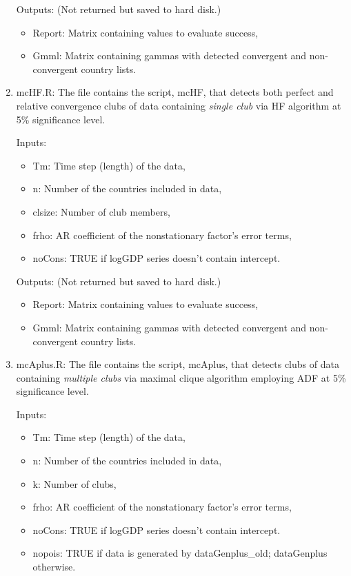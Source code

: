 \documentclass{article}
\begin{document}
\begin{enumerate}
		Outputs: (Not returned but saved to hard disk.)
		
		\begin{itemize}
		\item Report: Matrix containing values to evaluate success,
		\item Gmml: Matrix containing gammas with detected convergent and non-convergent country lists.
		\end{itemize}		 	
		
	\item mcHF.R: The file contains the script, mcHF, that detects both perfect and relative convergence clubs of data containing \textit{single club} via HF algorithm at 5\% significance level.
	
	Inputs:
	\begin{itemize}
		
		\item Tm: Time step (length) of the data,
		\item n: Number of the countries included in data,
		\item clsize: Number of club members, 
		\item frho: AR coefficient of the nonstationary factor's error terms,
		\item noCons: TRUE if logGDP series doesn't contain intercept.
	\end{itemize}
	
	Outputs: (Not returned but saved to hard disk.)
	
	\begin{itemize}
		\item Report: Matrix containing values to evaluate success,
		\item Gmml: Matrix containing gammas with detected convergent and non-convergent country lists.
	\end{itemize}		 	
	
		\item mcAplus.R: The file contains the script, mcAplus, that detects clubs of data containing \textit{multiple clubs} via maximal clique algorithm employing ADF at 5\% significance level.
		
		Inputs:
		\begin{itemize}
			
			\item Tm: Time step (length) of the data,
			\item n: Number of the countries included in data,
			\item k: Number of clubs, 
			\item frho: AR coefficient of the nonstationary factor's error terms,
			\item noCons: TRUE if logGDP series doesn't contain intercept.
			\item nopois: TRUE if data is generated by dataGenplus\_old; dataGenplus otherwise.
		\end{itemize}
		

\end{enumerate}
\end{document}
